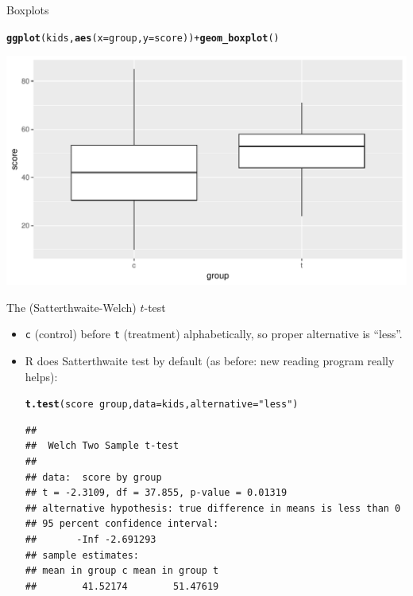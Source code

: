 \documentclass[unknownkeysallowed]{beamer}\usepackage[]{graphicx}\usepackage[]{color}
\makeatletter
\def\maxwidth{ %
  \ifdim\Gin@nat@width>\linewidth
    \linewidth
  \else
    \Gin@nat@width
  \fi
}
\newcommand{\hlstr}[1]{\textcolor[rgb]{0.192,0.494,0.8}{#1}}%
\newcommand{\hlopt}[1]{\textcolor[rgb]{0,0,0}{#1}}%
\newcommand{\hlstd}[1]{\textcolor[rgb]{0.345,0.345,0.345}{#1}}%
\newcommand{\hlkwc}[1]{\textcolor[rgb]{0.333,0.667,0.333}{#1}}%
\newcommand{\hlkwd}[1]{\textcolor[rgb]{0.737,0.353,0.396}{\textbf{#1}}}%
\newenvironment{kframe}{%
 \def\at@end@of@kframe{}%
 \ifinner\ifhmode%
  \def\at@end@of@kframe{\end{minipage}}%
  \begin{minipage}{\columnwidth}%
 \fi\fi%
 \def\FrameCommand##1{\hskip\@totalleftmargin \hskip-\fboxsep
 \colorbox{shadecolor}{##1}\hskip-\fboxsep
     \hskip-\linewidth \hskip-\@totalleftmargin \hskip\columnwidth}%
 \MakeFramed {\advance\hsize-\width
   \@totalleftmargin\z@ \linewidth\hsize
   \@setminipage}}%
 {\par\unskip\endMakeFramed%
 \at@end@of@kframe}
\newenvironment{knitrout}{}{} %
\makeatother
\begin{document}
\begin{frame}[fragile]{Boxplots}
  
\begin{knitrout}
\color{fgcolor}\begin{kframe}
\begin{alltt}
\hlkwd{ggplot}\hlstd{(kids,}\hlkwd{aes}\hlstd{(}\hlkwc{x}\hlstd{=group,}\hlkwc{y}\hlstd{=score))}\hlopt{+}\hlkwd{geom_boxplot}\hlstd{()}
\end{alltt}
\end{kframe}
\includegraphics[width=\maxwidth]{figure/unnamed-chunk-58-1} 

\end{knitrout}
  
\end{frame}

\begin{frame}[fragile]{The (Satterthwaite-Welch) $t$-test}
  
  \begin{itemize}
  \item \texttt{c} (control) before \texttt{t} (treatment)
    alphabetically, so proper alternative is ``less''.
  \item R does Satterthwaite test by default (as before: new reading program really helps):


\begin{knitrout}\footnotesize
{}\color{fgcolor}\begin{kframe}
\begin{alltt}
\hlkwd{t.test}\hlstd{(score}\hlopt{~}\hlstd{group,}\hlkwc{data}\hlstd{=kids,}\hlkwc{alternative}\hlstd{=}\hlstr{"less"}\hlstd{)}
\end{alltt}
\begin{verbatim}
## 
## 	Welch Two Sample t-test
## 
## data:  score by group
## t = -2.3109, df = 37.855, p-value = 0.01319
## alternative hypothesis: true difference in means is less than 0
## 95 percent confidence interval:
##       -Inf -2.691293
## sample estimates:
## mean in group c mean in group t 
##        41.52174        51.47619
\end{verbatim}
\end{kframe}
\end{knitrout}
  \end{itemize}
  
\end{frame}
\end{document}

